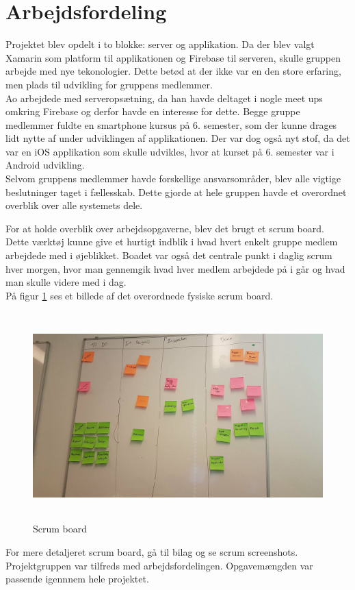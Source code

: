 \section{Arbejdsfordeling}
Projektet blev opdelt i to blokke: server og applikation. Da der blev valgt Xamarin som platform til applikationen og Firebase til serveren, skulle gruppen arbejde med nye tekonologier. Dette betød at der ikke var en den store erfaring, men plads til udvikling for gruppens medlemmer. \\
Ao arbejdede med serveropsætning, da han havde deltaget i nogle meet ups omkring Firebase og derfor havde en interesse for dette. Begge gruppe medlemmer fuldte en smartphone kursus på 6. semester, som der kunne drages lidt nytte af under udviklingen af applikationen. Der var dog også nyt stof, da det var en iOS applikation som skulle udvikles, hvor at kurset på 6. semester var i Android udvikling. \\
Selvom gruppens medlemmer havde forskellige ansvarsområder, blev alle vigtige beslutninger taget i fællesskab. Dette gjorde at hele gruppen havde et overordnet overblik over alle systemets dele.

For at holde overblik over arbejdsopgaverne, blev det brugt et scrum board. Dette værktøj kunne give et hurtigt indblik i hvad hvert enkelt gruppe medlem arbejdede med i øjeblikket. Boadet var også det centrale punkt i daglig scrum hver morgen, hvor man gennemgik hvad hver medlem arbejdede på i går og hvad man skulle videre med i dag. \\
På figur \ref{fig:Scrumboard} ses et billede af det overordnede fysiske scrum board.

\begin{figure} [H]
	\begin{center}
		\includegraphics[height=8cm, width=12cm]{Arbejdsfordeling/ScrumBoard}
	\end{center}
	\caption{Scrum board}
	\label{fig:Scrumboard}
\end{figure}

For mere detaljeret scrum board, gå til bilag og se scrum screenshots. \\
Projektgruppen var tilfreds med arbejdsfordelingen. Opgavemængden var passende igennnem hele projektet.

\clearpage